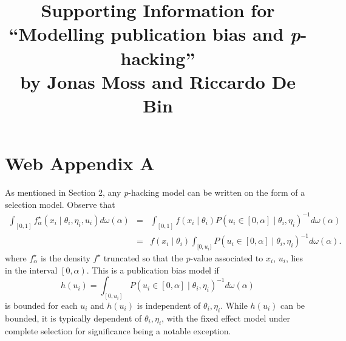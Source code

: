 \documentclass[english]{article}
\title{Supporting Information for ``Modelling publication bias and \textit{p}-hacking''\\ by Jonas Moss and Riccardo De Bin}
\author{}
\date{}
\begin{document}
\maketitle


\section*{Web Appendix A}

As mentioned in Section 2, any \textit{p}-hacking model can be written on the form of a selection model. Observe that
\begin{eqnarray*}
\int_{[0,1]}f_\alpha^{\star}(x_{i}\mid\theta_{i},\eta_{i}, u_i)d\omega(\alpha) & = & \int_{[0,1]}f(x_{i}\mid\theta_{i})P(u_i\in\left[0,\alpha\right]\mid\theta_{i},\eta_{i})^{-1}d\omega(\alpha)\\
 & = & f(x_{i}\mid\theta_{i})\int_{[0,u_i)}P(u_i\in\left[0,\alpha\right]\mid\theta_{i},\eta_{i})^{-1}d\omega(\alpha).
\end{eqnarray*}
where $f_\alpha^{\star}$ is the density $f^{\star}$ truncated so that the \textit{p}-value associated to $x_i$, $u_i$, lies in the interval $\left[0,\alpha\right)$. This is a publication bias model if $$h(u_i)=\int_{[0,u_i]}P(u_i\in\left[0,\alpha\right]\mid\theta_{i},\eta_{i})^{-1}d\omega(\alpha)$$ is bounded for each $u_i$ and $h(u_i)$ is independent of $\theta_{i},\eta_{i}$. While $h(u_i)$ can be bounded, it is typically dependent of $\theta_{i},\eta_{i}$, with the fixed effect model under complete selection for significance being a notable exception.
\end{document}
